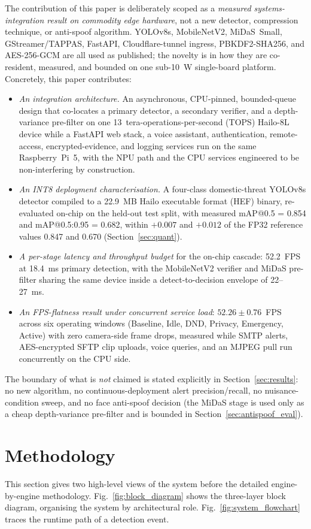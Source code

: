 \documentclass{ieeeaccess}
\begin{document}
The contribution of this paper is deliberately scoped as a \emph{measured systems-integration result on commodity edge hardware}, not a new detector, compression technique, or anti-spoof algorithm. YOLOv8s, MobileNetV2, MiDaS~Small, GStreamer/TAPPAS, FastAPI, Cloudflare-tunnel ingress, PBKDF2-SHA256, and AES-256-GCM are all used as published; the novelty is in how they are co-resident, measured, and bounded on one sub-10~W single-board platform. Concretely, this paper contributes:
\begin{itemize}
\item \emph{An integration architecture.} An asynchronous, CPU-pinned, bounded-queue design that co-locates a primary detector, a secondary verifier, and a depth-variance pre-filter on one 13~tera-operations-per-second (TOPS) Hailo-8L device while a FastAPI web stack, a voice assistant, authentication, remote-access, encrypted-evidence, and logging services run on the same Raspberry~Pi~5, with the NPU path and the CPU services engineered to be non-interfering by construction.
\item \emph{An INT8 deployment characterisation.} A four-class domestic-threat YOLOv8s detector compiled to a 22.9~MB Hailo executable format (HEF) binary, re-evaluated on-chip on the held-out test split, with measured mAP{@}0.5 = 0.854 and mAP{@}0.5:0.95 = 0.682, within $+0.007$ and $+0.012$ of the FP32 reference values 0.847 and 0.670 (Section~\ref{sec:quant}).
\item \emph{A per-stage latency and throughput budget} for the on-chip cascade: 52.2~FPS at 18.4~ms primary detection, with the MobileNetV2 verifier and MiDaS pre-filter sharing the same device inside a detect-to-decision envelope of 22--27~ms.
\item \emph{An FPS-flatness result under concurrent service load}: $52.26 \pm 0.76$~FPS across six operating windows (Baseline, Idle, DND, Privacy, Emergency, Active) with zero camera-side frame drops, measured while SMTP alerts, AES-encrypted SFTP clip uploads, voice queries, and an MJPEG pull run concurrently on the CPU side.
\end{itemize}
The boundary of what is \emph{not} claimed is stated explicitly in Section~\ref{sec:results}: no new algorithm, no continuous-deployment alert precision/recall, no nuisance-condition sweep, and no face anti-spoof decision (the MiDaS stage is used only as a cheap depth-variance pre-filter and is bounded in Section~\ref{sec:antispoof_eval}).


\section{Methodology}
\label{sec:methodology}
This section gives two high-level views of the system before the detailed engine-by-engine methodology. Fig.~\ref{fig:block_diagram} shows the three-layer block diagram, organising the system by architectural role. Fig.~\ref{fig:system_flowchart} traces the runtime path of a detection event.
\end{document}
